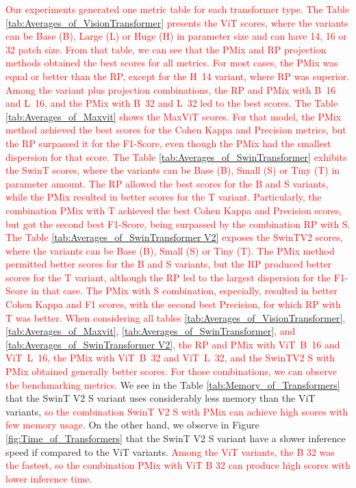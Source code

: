 \textcolor{red}{
Our experiments generated one metric table for each transformer type. 
The Table \ref{tab:Averages_of_VisionTransformer} presents the \gls{ViT} scores, where the variants can be Base (B), Large (L) or Huge (H) in parameter size and can have 14, 16 or 32 patch size. From that table, we can see that the \gls{PMix} and \gls{RP} projection methods obtained the best scores for all metrics. For most cases, the \gls{PMix} was equal or better than the \gls{RP}, except for the \mbox{H 14} variant, where \gls{RP} was superior. Among the variant plus projection combinations, the \gls{RP} and \gls{PMix} with \mbox{B 16} and \mbox{L 16}, and the \gls{PMix} with \mbox{B 32} and \mbox{L 32} led to the best scores. 
The Table \ref{tab:Averages_of_Maxvit} shows the \gls{MaxViT} scores. For that model, the \gls{PMix} method achieved the best scores for the Cohen Kappa and Precision metrics, but the \gls{RP} surpassed it for the F1-Score, even though the \gls{PMix} had the smallest dispersion for that score.  
The Table \ref{tab:Averages_of_SwinTransformer} exhibits the \gls{SwinT} scores, where the variants can be Base (B), Small (S) or Tiny (T) in parameter amount. The \gls{RP} allowed the best scores for the B and S variants, while the \gls{PMix} resulted in better scores for the T variant. Particularly, the combination \gls{PMix} with T achieved the best Cohen Kappa and Precision scores, but got the second best F1-Score, being surpassed by the combination \gls{RP} with S.
The Table \ref{tab:Averages_of_SwinTransformer V2} exposes the \gls{SwinTV2} scores, where the variants can be Base (B), Small (S) or Tiny (T). The \gls{PMix} method permitted better scores for the B and S variants, but the \gls{RP} produced better scores for the T variant, although the \gls{RP} led to the largest dispersion for the F1-Score in that case. The \gls{PMix} with S combination, especially, resulted in better Cohen Kappa and F1 scores, with the second best Precision, for which \gls{RP} with T was better.
When considering all tables \ref{tab:Averages_of_VisionTransformer}, \ref{tab:Averages_of_Maxvit}, \ref{tab:Averages_of_SwinTransformer}, and \ref{tab:Averages_of_SwinTransformer V2}, the \gls{RP} and \gls{PMix} with \mbox{\gls{ViT} B 16} and \mbox{\gls{ViT} L 16}, the \gls{PMix} with \mbox{\gls{ViT} B 32} and \mbox{\gls{ViT} L 32}, and the \gls{SwinTV2} S with \gls{PMix} obtained generally better scores. For those combinations, we can observe the benchmarking metrics.
}
We see in the Table \ref{tab:Memory_of_Transformers} that the \gls{SwinT} V2 S variant uses considerably less memory than the \gls{ViT} variants, \textcolor{red}{so the combination \gls{SwinT} V2 S with \gls{PMix} can achieve high scores with few memory usage}. On the other hand, we observe in Figure \ref{fig:Time_of_Transformers} that the \gls{SwinT} V2 S variant have a slower inference speed if compared to the \gls{ViT} variants. \textcolor{red}{ Among the \gls{ViT} variants, the B 32 was the fastest, so the combination \gls{PMix} with \gls{ViT} B 32 can produce high scores with lower inference time.}

